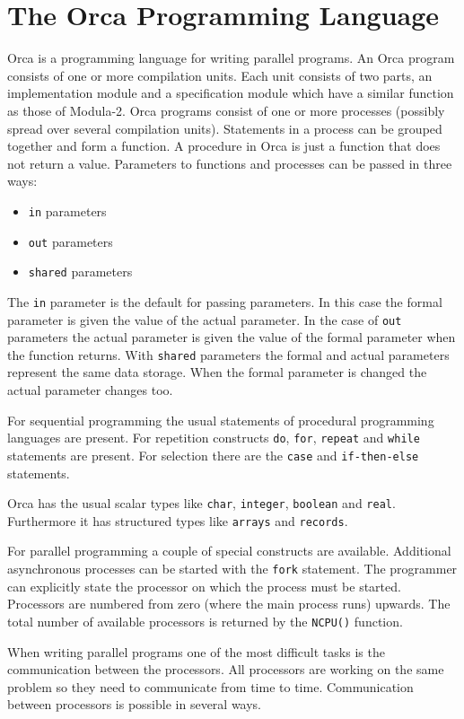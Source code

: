 \documentclass[a4paper,11pt]{article}
\begin{document}
\section{The Orca Programming Language}
\label{sec:orca}
Orca is a programming language for writing parallel programs. 
An Orca program consists of one or more compilation units. Each unit
consists of two parts, an implementation module and a specification module
which have a similar function as those of Modula-2.
Orca programs consist of one or more processes (possibly spread over
several compilation units).
Statements in a process can be grouped together
and form a function. A procedure in Orca is just
a function that does not return a value. Parameters to functions and
processes can be passed in three ways:
\begin{itemize}
\item {\tt in} parameters
\item {\tt out} parameters
\item {\tt shared} parameters
\end{itemize}
The {\tt in} parameter is the default for passing parameters.
In this case the formal parameter is given the value of the actual parameter.
In the case of {\tt out} parameters the actual parameter is given the value of
the formal parameter when the function returns. 
With {\tt shared} parameters the formal and
actual parameters represent the same data storage.
When the formal parameter is changed the actual parameter changes too.

For sequential programming the usual statements of procedural programming
languages
are present. For repetition constructs  {\tt do}, {\tt for},
{\tt repeat} and {\tt while}
statements are present. For selection there are the {\tt case} and
{\tt if-then-else} statements.

Orca has the usual scalar types like {\tt char}, {\tt integer},
{\tt boolean} and {\tt real}.
Furthermore it has structured types like {\tt arrays} and {\tt records}.

For parallel programming a couple of special constructs are available.
Additional asynchronous processes can be started with the {\tt fork}
statement. The programmer can explicitly state the processor on which
the process must be started. Processors are numbered from zero (where
the main process runs) upwards. The total number of available processors
is returned by the {\tt NCPU()} function.

When writing parallel programs one of the most difficult tasks is the
communication between the processors. All processors are working on the
same problem so they need to communicate 
from time to time. Communication between processors is possible in several
ways.
\end{document}
